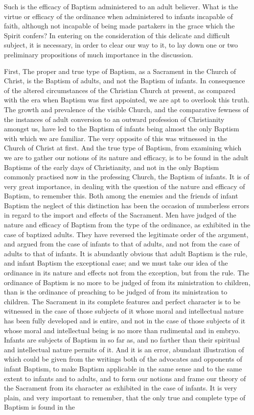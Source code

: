 \documentclass[]{book}
\begin{document}
Such is the efficacy of Baptism administered to an adult believer. What is the virtue or efficacy of the ordinance when administered to infants incapable of faith, although not incapable of being made partakers in the grace which the Spirit confers? In entering on the consideration of this delicate and difficult subject, it is necessary, in order to clear our way to it, to lay down one or two preliminary propositions of much importance in the discussion.

First, The proper and true type of Baptism, as a Sacrament in the Church of Christ, is the Baptism of adults, and not the Baptism of infants. In consequence of the altered circumstances of the Christian Church at present, as compared with the era when Baptism was first appointed, we are apt to overlook this truth. The growth and prevalence of the visible Church, and the comparative fewness of the instances of adult conversion to an outward profession of Christianity amongst us, have led to the Baptism of infants being almost the only Baptism with which we are familiar. The very opposite of this was witnessed in the Church of Christ at first. And the true type of Baptism, from examining which we are to gather our notions of its nature and efficacy, is to be found in the adult Baptisms of the early days of Christianity, and not in the only Baptism commonly practised now in the professing Church, the Baptism of infants. It is of very great importance, in dealing with the question of the nature and efficacy of Baptism, to remember this. Both among the enemies and the friends of infant Baptism the neglect of this distinction has been the occasion of numberless errors in regard to the import and effects of the Sacrament. Men have judged of the nature and efficacy of Baptism from the type of the ordinance, as exhibited in the case of baptized adults. They have reversed the legitimate order of the argument, and argued from the case of infants to that of adults, and not from the case of adults to that of infants. It is abundantly obvious that adult Baptism is the rule, and infant Baptism the exceptional case; and we must take our idea of the ordinance in its nature and effects not from the exception, but from the rule. The ordinance of Baptism is no more to be judged of from its ministration to children, than is the ordinance of preaching to be judged of from its ministration to children. The Sacrament in its complete features and perfect character is to be witnessed in the case of those subjects of it whose moral and intellectual nature has been fully developed and is entire, and not in the case of those subjects of it whose moral and intellectual being is no more than rudimental and in embryo. Infants are subjects of Baptism in so far as, and no farther than their spiritual and intellectual nature permits of it. And it is an error, abundant illustration of which could be given from the writings both of the advocates and opponents of infant Baptism, to make Baptism applicable in the same sense and to the same extent to infants and to adults, and to form our notions and frame our theory of the Sacrament from its character as exhibited in the case of infants. It is very plain, and very important to remember, that the only true and complete type of Baptism is found in the 
\end{document}
